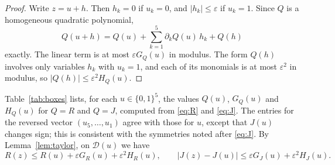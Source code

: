\documentclass{amsart}
\theoremstyle{remark}
\numberwithin{equation}{section}
\numberwithin{table}{section}
\newcommand{\D}{\mathcal{D}}
\begin{document}
\begin{proof}
Write $z=u+h$. Then $h_k=0$ if $u_k=0$, and $|h_k|\le\varepsilon$ if $u_k=1$. Since $Q$ is a homogeneous quadratic polynomial,
\[
Q(u+h)=Q(u)+\sum_{k=1}^5\partial_kQ(u)\,h_k+Q(h)
\]
exactly. The linear term is at most $\varepsilon G_Q(u)$ in modulus. The form $Q(h)$ involves only variables $h_k$ with $u_k=1$, and each of its monomials is at most $\varepsilon^2$ in modulus, so $|Q(h)|\le\varepsilon^2H_Q(u)$.
\end{proof}

Table~\ref{tab:boxes} lists, for each $u\in\{0,1\}^5$, the values $Q(u)$, $G_Q(u)$ and $H_Q(u)$ for $Q=R$ and $Q=J$, computed from \eqref{eq:R} and \eqref{eq:J}. The entries for the reversed vector $(u_5,\dots,u_1)$ agree with those for $u$, except that $J(u)$ changes sign; this is consistent with the symmetries noted after \eqref{eq:J}. By Lemma~\ref{lem:taylor}, on $\D(u)$ we have
\begin{equation}\label{eq:boxbounds}
R(z)\le R(u)+\varepsilon G_R(u)+\varepsilon^2H_R(u),\qquad
\bigl|J(z)-J(u)\bigr|\le\varepsilon G_J(u)+\varepsilon^2H_J(u).
\end{equation}
\end{document}
